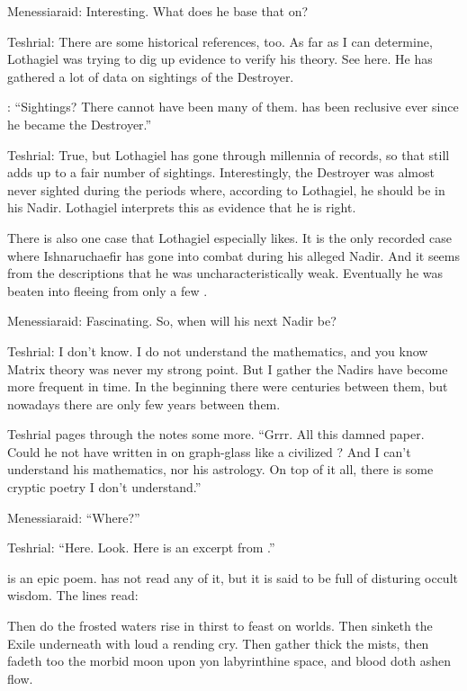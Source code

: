 Menessiaraid: 
Interesting. 
What does he base that on? 

Teshrial: 
There are some historical references, too. 
As far as I can determine, Lothagiel was trying to dig up evidence to verify his theory. 
See here. 
He has gathered a lot of data on sightings of the Destroyer.  

\Menessiaraid:
``Sightings? There cannot have been many of them. \Ishnaruchaefir has been reclusive ever since he became the Destroyer.''

Teshrial:
True, but Lothagiel has gone through millennia of records, so that still adds up to a fair number of sightings. 
Interestingly, the Destroyer was almost never sighted during the periods where, according to Lothagiel, he should be in his Nadir. 
Lothagiel interprets this as evidence that he is right. 

There is also one case that Lothagiel especially likes. 
It is the only recorded case where Ishnaruchaefir has gone into combat during his alleged Nadir. 
And it seems from the descriptions that he was uncharacteristically weak. 
Eventually he was beaten into fleeing from only a few \resphain. 

Menessiaraid: 
Fascinating. 
So, when will his next Nadir be? 

Teshrial:
I don't know. 
I do not understand the mathematics, and you know Matrix theory was never my strong point.
But I gather the Nadirs have become more frequent in time. 
In the beginning there were centuries between them, but nowadays there are only few years between them. 

Teshrial pages through the notes some more. 
``Grrr. All this damned paper. Could he not have written in on graph-glass like a civilized \resphan?
And I can't understand his mathematics, nor his astrology.
On top of it all, there is some cryptic poetry I don't understand.''

Menessiaraid:
``Where?''

Teshrial:
``Here. Look. Here is an excerpt from \WanderersInDarknessEmph.'' 

\WanderersInDarknessEmph is an epic poem. 
\Teshrial has not read any of it, but it is said to be full of disturing occult wisdom.
The lines read:



\begin{poetry}
  Then do the frosted waters rise in thirst to feast on worlds. 
  Then sinketh the Exile underneath with loud a rending cry. 
  Then gather thick the mists, then fadeth too the morbid moon
  upon yon labyrinthine space, and blood doth ashen flow. 
\end{poetry}



